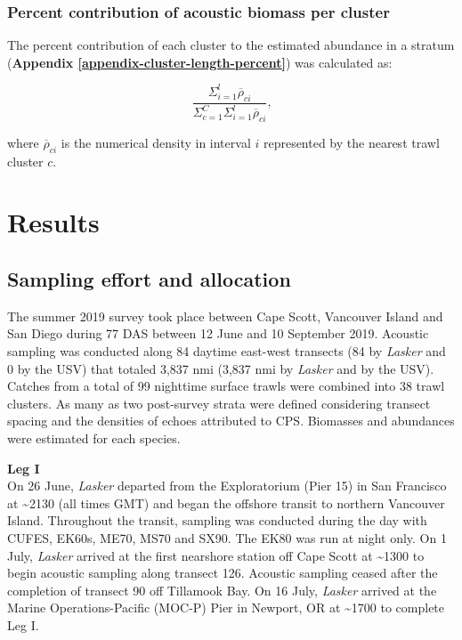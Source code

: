 \documentclass[]{article}
\begin{document}
\hypertarget{methods-cluster-biomass-density}{%
\subsubsection{Percent contribution of acoustic biomass per cluster}\label{methods-cluster-biomass-density}}

The percent contribution of each cluster to the estimated abundance in a stratum (\textbf{Appendix \ref{appendix-cluster-length-percent}}) was calculated as:

\begin{equation}
  \frac{\Sigma_{i = 1}^{l}\overline{\rho}_{ci}}{\Sigma_{c=1}^{C}\Sigma_{i=1}^{l}\overline{\rho}_{ci}}{\text{,}}
  \label{eq:pct-acoustic-biomass}
\end{equation}

where \(\overline{\rho}_{ci}\) is the numerical density in interval \(i\) represented by the nearest trawl cluster \(c\).

\newpage

\hypertarget{results}{%
\section{Results}\label{results}}

\hypertarget{results-sampling-effort}{%
\subsection{Sampling effort and allocation}\label{results-sampling-effort}}

The summer 2019 survey took place between Cape Scott, Vancouver Island and San Diego during 77 DAS between 12 June and 10 September 2019. Acoustic sampling was conducted along 84 daytime east-west transects (84 by \emph{Lasker} and 0 by the USV) that totaled 3,837 nmi (3,837 nmi by \emph{Lasker} and by the USV). Catches from a total of 99 nighttime surface trawls were combined into 38 trawl clusters. As many as two post-survey strata were defined considering transect spacing and the densities of echoes attributed to CPS. Biomasses and abundances were estimated for each species.

\textbf{Leg I}\\
On 26 June, \emph{Lasker} departed from the Exploratorium (Pier 15) in San Francisco at \textasciitilde2130 (all times GMT) and began the offshore transit to northern Vancouver Island. Throughout the transit, sampling was conducted during the day with CUFES, EK60s, ME70, MS70 and SX90. The EK80 was run at night only. On 1 July, \emph{Lasker} arrived at the first nearshore station off Cape Scott at \textasciitilde1300 to begin acoustic sampling along transect 126. Acoustic sampling ceased after the completion of transect 90 off Tillamook Bay. On 16 July, \emph{Lasker} arrived at the Marine Operations-Pacific (MOC-P) Pier in Newport, OR at \textasciitilde1700 to complete Leg I.
\end{document}
